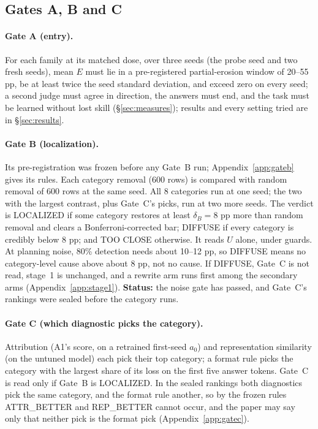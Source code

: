 \documentclass{article}
\theoremstyle{plain}
\theoremstyle{definition}
\theoremstyle{remark}
\begin{document}
\subsection{Gates A, B and C}
\label{sec:gates}

\paragraph{Gate A (entry).}
For each family at its matched dose, over three seeds (the probe seed and two
fresh seeds), mean $E$ must lie in a pre-registered partial-erosion window
of 20--55 pp, be at least twice the seed standard deviation, and exceed zero on
every seed; a second judge must agree in direction, the answers must end, and
the task must be learned without lost skill (\S\ref{sec:measures}); results
and every setting tried are in \S\ref{sec:results}.

\paragraph{Gate B (localization).}
Its pre-registration was frozen before any Gate~B run;
Appendix~\ref{app:gateb} gives its rules. Each category removal (600 rows) is
compared with random removal of 600 rows at the same seed. All 8 categories
run at one seed; the two with the largest contrast, plus Gate~C's picks, run at
two more seeds. The verdict is LOCALIZED if some category restores at least
$\delta_B = 8$ pp more than random removal and clears a Bonferroni-corrected
bar; DIFFUSE if every category is credibly below 8 pp; and TOO CLOSE
otherwise. It reads $U$ alone, under guards. At planning noise, 80\%
detection needs about 10--12 pp, so DIFFUSE means no category-level cause above
about 8 pp, not no cause. If DIFFUSE, Gate~C is not read, stage~1 is
unchanged, and a rewrite arm runs first among the secondary arms
(Appendix~\ref{app:stage1}). \textbf{Status:} the noise gate has passed, and
Gate~C's rankings were sealed before the category runs.

\paragraph{Gate C (which diagnostic picks the category).}
Attribution (A1's score, on a retrained first-seed $a_0$) and representation
similarity (on the untuned model) each pick their top category; a format rule
picks the category with the largest share of its loss on the first five answer
tokens. Gate~C is read only if Gate~B is LOCALIZED. In the sealed rankings both
diagnostics pick the same category, and the format rule another, so by the
frozen rules ATTR\_BETTER and REP\_BETTER cannot occur, and the paper may say
only that neither pick is the format pick (Appendix~\ref{app:gatec}).
\end{document}
